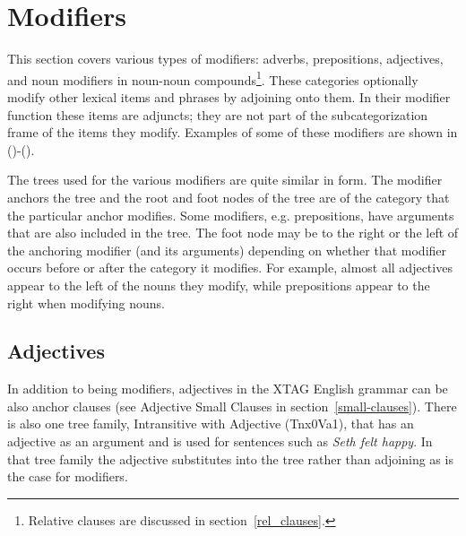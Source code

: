 \chapter{Modifiers}
\label{modifiers}

This section covers various types of modifiers: adverbs, prepositions,
adjectives, and noun modifiers in noun-noun compounds\footnote{Relative clauses
are discussed in section~\ref{rel_clauses}.}.  These categories optionally
modify other lexical items and phrases by adjoining onto them.  In their
modifier function these items are adjuncts; they are not part of the
subcategorization frame of the items they modify.  Examples of some of these
modifiers are shown in ()-().




The trees used for the various modifiers are quite similar in form.  The
modifier anchors the tree and the root and foot nodes of the tree are of the
category that the particular anchor modifies. Some modifiers,
e.g. prepositions, have arguments that are also included in the tree.  The foot
node may be to the right or the left of the anchoring modifier (and its
arguments) depending on whether that modifier occurs before or after the
category it modifies. For example, almost all adjectives appear to the left of
the nouns they modify, while prepositions appear to the right when modifying
nouns.


\section{Adjectives}
\label{adj-modifier}

In addition to being modifiers, adjectives in the XTAG English grammar can be
also anchor clauses (see Adjective Small Clauses in
section~\ref{small-clauses}).  There is also one tree family, Intransitive with
Adjective (Tnx0Va1), that has an adjective as an argument and is used for
sentences such as {\it Seth felt happy}. In that tree family the adjective
substitutes into the tree rather than adjoining as is the case for modifiers.



